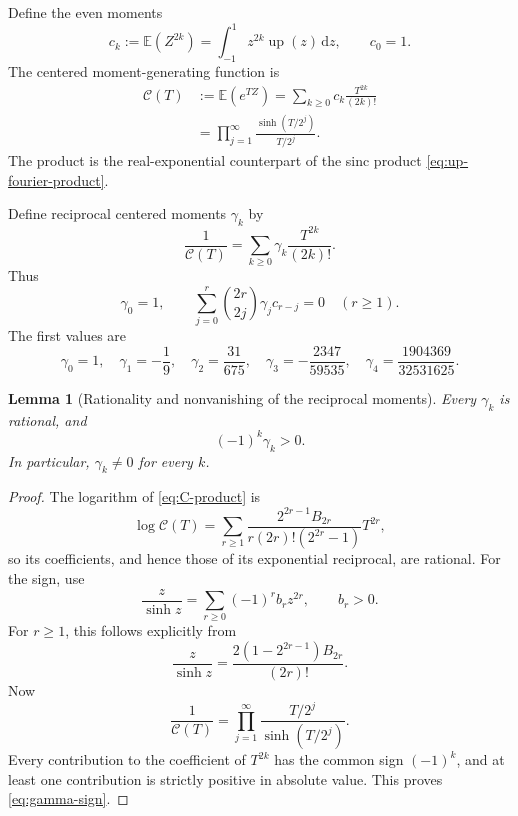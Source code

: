\documentclass[11pt]{article}
\newtheorem{lemma}[theorem]{Lemma}
\newcommand{\upf}{\operatorname{up}}
\newcommand{\E}{\mathbb{E}}
\newcommand{\dd}{\,\mathrm{d}}
\begin{document}
Define the even moments
\begin{equation}
 c_k:=\E(Z^{2k})=\int_{-1}^{1}z^{2k}\upf(z)\dd z,
 \qquad c_0=1.
 \label{eq:ck}
\end{equation}
The centered moment-generating function is
\begin{align}
 \mathscr C(T)
 &:=\E(e^{TZ})
   =\sum_{k\ge0}c_k\frac{T^{2k}}{(2k)!} \\
 &=\prod_{j=1}^{\infty}
   \frac{\sinh(T/2^j)}{T/2^j}.
 \label{eq:C-product}
\end{align}
The product is the real-exponential counterpart of the sinc product
\eqref{eq:up-fourier-product}.

Define reciprocal centered moments $\gamma_k$ by
\begin{equation}
 \frac{1}{\mathscr C(T)}
 =\sum_{k\ge0}\gamma_k\frac{T^{2k}}{(2k)!}.
 \label{eq:gamma-definition}
\end{equation}
Thus
\begin{equation}
 \gamma_0=1,
 \qquad
 \sum_{j=0}^{r}\binom{2r}{2j}\gamma_jc_{r-j}=0
 \quad(r\ge1).
 \label{eq:gamma-convolution}
\end{equation}
The first values are
\begin{equation}
 \gamma_0=1,
 \quad \gamma_1=-\frac19,
 \quad \gamma_2=\frac{31}{675},
 \quad \gamma_3=-\frac{2347}{59535},
 \quad \gamma_4=\frac{1904369}{32531625}.
 \label{eq:gamma-first}
\end{equation}

\begin{lemma}[Rationality and nonvanishing of the reciprocal moments]
\label{lem:gamma-sign}
Every $\gamma_k$ is rational, and
\begin{equation}
 (-1)^k\gamma_k>0.
 \label{eq:gamma-sign}
\end{equation}
In particular, $\gamma_k\ne0$ for every $k$.
\end{lemma}

\begin{proof}
The logarithm of \eqref{eq:C-product} is
\begin{equation}
 \log\mathscr C(T)
 =\sum_{r\ge1}
 \frac{2^{2r-1}B_{2r}}
 {r(2r)!(2^{2r}-1)}T^{2r},
 \label{eq:log-C}
\end{equation}
so its coefficients, and hence those of its exponential reciprocal, are
rational.  For the sign, use
\begin{equation}
 \frac{z}{\sinh z}
 =\sum_{r\ge0}(-1)^r b_r z^{2r},
 \qquad b_r>0.
 \label{eq:z-over-sinh-sign}
\end{equation}
For $r\ge1$, this follows explicitly from
\begin{equation}
 [z^{2r}]\frac{z}{\sinh z}
 =\frac{2(1-2^{2r-1})B_{2r}}{(2r)!}.
\end{equation}
Now
\begin{equation}
 \frac1{\mathscr C(T)}
 =\prod_{j=1}^{\infty}\frac{T/2^j}{\sinh(T/2^j)}.
\end{equation}
Every contribution to the coefficient of $T^{2k}$ has the common sign
$(-1)^k$, and at least one contribution is strictly positive in absolute
value.  This proves \eqref{eq:gamma-sign}.
\end{proof}
\end{document}
